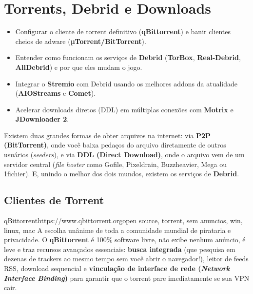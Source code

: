 \documentclass{pousadaguide}
\begin{document}
\chapter{Torrents, Debrid e Downloads}

\begin{missao}
\begin{itemize}
  \item Configurar o cliente de torrent definitivo (\textbf{qBittorrent}) e banir clientes cheios de adware (\textbf{µTorrent/BitTorrent}).
  \item Entender como funcionam os serviços de \textbf{Debrid} (\textbf{TorBox}, \textbf{Real-Debrid}, \textbf{AllDebrid}) e por que eles mudam o jogo.
  \item Integrar o \textbf{Stremio} com Debrid usando os melhores addons da atualidade (\textbf{AIOStreams} e \textbf{Comet}).
  \item Acelerar downloads diretos (DDL) em múltiplas conexões com \textbf{Motrix} e \textbf{JDownloader 2}.
\end{itemize}
\end{missao}

Existem duas grandes formas de obter arquivos na internet: via \textbf{P2P (BitTorrent)}, onde você baixa pedaços do arquivo diretamente de outros usuários (\emph{seeders}), e via \textbf{DDL (Direct Download)}, onde o arquivo vem de um servidor central (\emph{file hoster} como Gofile, Pixeldrain, Buzzheavier, Mega ou 1fichier). E, unindo o melhor dos dois mundos, existem os serviços de \textbf{Debrid}.

\section{Clientes de Torrent}

\begin{ferramenta}[goat,logo=qbittorrent]{qBittorrent}{https://www.qbittorrent.org}{open source, torrent, sem anuncios, win, linux, mac}
A escolha unânime de toda a comunidade mundial de pirataria e privacidade. O \textbf{qBittorrent} é 100\% software livre, não exibe nenhum anúncio, é leve e traz recursos avançados essenciais: \textbf{busca integrada} (que pesquisa em dezenas de trackers ao mesmo tempo sem você abrir o navegador!), leitor de feeds RSS, download sequencial e \textbf{vinculação de interface de rede (\emph{Network Interface Binding})} para garantir que o torrent pare imediatamente se sua VPN cair. 
\end{ferramenta}
\end{document}

